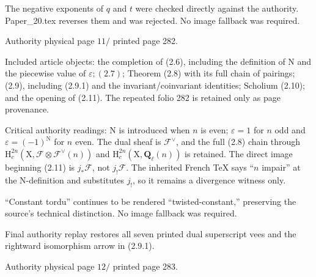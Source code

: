 \documentclass[10pt,leqno]{article}
\begin{document}
\noindent The negative exponents of \(q\) and \(t\) were checked directly against the authority. Paper\_20.tex reverses them and was rejected. No image fallback was required.\par

\clearpage

\label{physical-11}\par\smallskip

\noindent Authority physical page \(11 /\) printed page 282.\par

\noindent Included article objects: the completion of (2.6), including the definition of \(\mathrm{N}\) and the piecewise value of \(\varepsilon ; (2.7)\); Theorem (2.8) with its full chain of pairings; (2.9), including (2.9.1) and the invariant/coinvariant identities; Scholium (2.10); and the opening of (2.11). The repeated folio 282 is retained only as page provenance.\par

\noindent Critical authority readings: \(\mathrm{N}\) is introduced when \(n\) is even; \(\varepsilon =1\) for \(n\) odd and \(\varepsilon =(- 1)^{\mathrm{N}}\) for \(n\) even. The dual sheaf is \(\mathcal{F} ^{\vee }\), and the full (2.8) chain through \(\mathrm{H}_{c}^{2n}(\mathrm{X},\mathcal{F} \otimes \mathcal{F} ^{\vee }(n))\) and \(\mathrm{H}_{c}^{2n}(\mathrm{X},\mathbf{Q}_{\ell }(n))\) is retained. The direct image beginning (2.11) is \(j_{*}\mathcal{F} \), not \(j_{!}\mathcal{F} \). The inherited French TeX says “\(n\) impair” at the \(\mathrm{N}\)-definition and substitutes \(j_{!}\), so it remains a divergence witness only.\par

\noindent “Constant tordu” continues to be rendered “twisted-constant,” preserving the source’s technical distinction. No image fallback was required.\par

\noindent Final authority replay restores all seven printed dual superscript vees and the rightward isomorphism arrow in (2.9.1).\par

\clearpage

\label{physical-12}\par\smallskip

\noindent Authority physical page \(12 /\) printed page 283.\par
\end{document}
